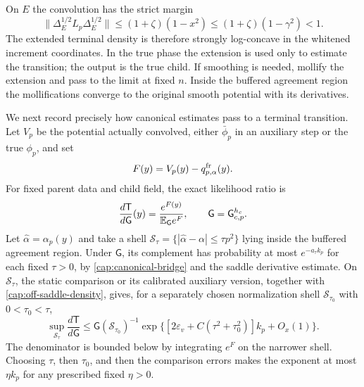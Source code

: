 On \(E\) the convolution has the strict margin
\[
 \|\Delta_E^{1/2}L_p\Delta_E^{1/2}\|
 \le(1+\zeta)(1-x^2)
 \le(1+\zeta)(1-\gamma^2)<1 .
\]
The extended terminal density is therefore strongly log-concave in the
whitened increment coordinates. In the true phase the extension is used only
to estimate the transition; the output is the true child. If smoothing is
needed, mollify the extension and pass to the limit at fixed \(n\).
Inside the buffered agreement region the mollifications converge to the
original smooth potential with its derivatives.

We next record precisely how canonical estimates pass to a terminal
transition. Let \(V_p\) be the potential actually convolved, either
\(\bar\phi_p\) in an auxiliary step or the true \(\phi_p\), and set
\[
 F(y)=V_p(y)-q_{p,\alpha}^{\rm fr}(y).
\]
For fixed parent data and child field, the exact likelihood ratio is
\begin{equation}\label{cap:bridge-density-ratio}
 \frac{d\mathsf T}{d\mathsf G}(y)
 =\frac{e^{F(y)}}{\mathbb E_{\mathsf G}e^F},
 \qquad \mathsf G=\mathsf G_{c,p}^{h_c}.
\end{equation}
Let \(\widehat\alpha=\alpha_p(y)\) and take a shell
\(\mathcal S_\tau=\{|\widehat\alpha-\alpha|\le\tau p^2\}\) lying inside
the buffered agreement region. Under \(\mathsf G\), its complement has
probability at most \(e^{-a_\tau k_p}\) for each fixed \(\tau>0\), by
\eqref{cap:canonical-bridge} and the saddle derivative estimate. On
\(\mathcal S_\tau\), the static comparison or its calibrated auxiliary
version, together with \eqref{cap:off-saddle-density}, gives, for a separately
chosen normalization shell \(\mathcal S_{\tau_0}\) with \(0<\tau_0<\tau\),
\begin{equation}\label{cap:shell-likelihood}
 \sup_{\mathcal S_\tau}\frac{d\mathsf T}{d\mathsf G}
 \le \mathsf G(\mathcal S_{\tau_0})^{-1}
       \exp\{[2\varepsilon_v+C(\tau^2+\tau_0^2)]k_p+O_x(1)\}.
\end{equation}
The denominator is bounded below by integrating \(e^F\) on the narrower
shell. Choosing \(\tau\), then \(\tau_0\), and then the comparison errors makes the exponent
at most \(\eta k_p\) for any prescribed fixed \(\eta>0\).

